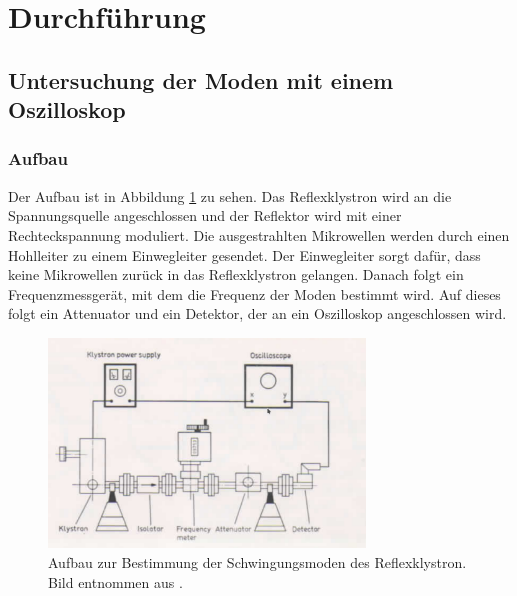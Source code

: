 \section{Durchführung}
\label{sec:Durchführung}

\subsection{Untersuchung der Moden mit einem Oszilloskop}
\subsubsection{Aufbau}
Der Aufbau ist in Abbildung \ref{fig:moden_aufbau} zu sehen.
Das Reflexklystron wird an die Spannungsquelle angeschlossen und der Reflektor wird mit einer Rechteckspannung moduliert.
Die ausgestrahlten Mikrowellen werden durch einen Hohlleiter zu einem Einwegleiter gesendet.
Der Einwegleiter sorgt dafür, dass keine Mikrowellen zurück in das Reflexklystron gelangen.
Danach folgt ein Frequenzmessgerät, mit dem die Frequenz der Moden bestimmt wird.
Auf dieses folgt ein Attenuator und ein Detektor, der an ein Oszilloskop angeschlossen wird.

\begin{figure}
    \centering
    \includegraphics[width=0.75\textwidth]{content/data/Aufbau_Moden.png}
    \caption{Aufbau zur Bestimmung der Schwingungsmoden des Reflexklystron. Bild entnommen aus \cite[8]{Anleitung}.}
    \label{fig:moden_aufbau}
\end{figure}

